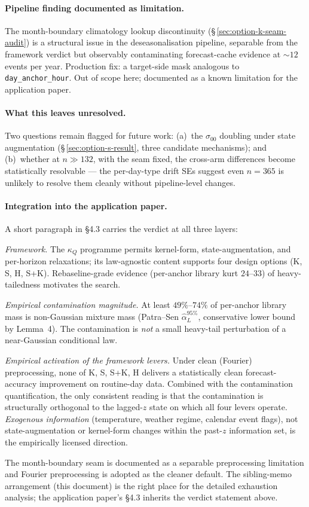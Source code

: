 \documentclass[11pt]{article}
\begin{document}
\paragraph{Pipeline finding documented as limitation.} The
month-boundary climatology lookup discontinuity
(\S\,\ref{sec:option-k-seam-audit}) is a structural issue in the
deseasonalisation pipeline, separable from the framework verdict
but observably contaminating forecast-cache evidence at
\(\sim 12\) events per year. Production fix: a target-side mask
analogous to \texttt{day\_anchor\_hour}. Out of scope here;
documented as a known limitation for the application paper.

\paragraph{What this leaves unresolved.} Two questions remain
flagged for future work: (a)~the \(\sigma_{00}\) doubling under
state augmentation
(\S\,\ref{sec:option-s-result}, three candidate mechanisms); and
(b)~whether at \(n \gg 132\), with the seam fixed, the cross-arm
differences become statistically resolvable --- the per-day-type
drift SEs suggest even \(n = 365\) is unlikely to resolve them
cleanly without pipeline-level changes.

\paragraph{Integration into the application paper.} A short paragraph
in \S4.3 carries the verdict at all three layers:

\emph{Framework.} The \(\kappa_Q\) programme permits kernel-form,
state-augmentation, and per-horizon relaxations; its law-agnostic
content supports four design options
(\textsf{K}, \textsf{S}, \textsf{H}, \textsf{S+K}). Rebaseline-grade
evidence (per-anchor library kurt \(24\)--\(33\)) of heavy-tailedness
motivates the search.

\emph{Empirical contamination magnitude.} At least \(49\%\)--\(74\%\)
of per-anchor library mass is non-Gaussian mixture mass (Patra--Sen
\(\hat\alpha_L^{95\%}\), conservative lower bound by Lemma~4). The
contamination is \emph{not} a small heavy-tail perturbation of a
near-Gaussian conditional law.

\emph{Empirical activation of the framework levers.} Under clean
(Fourier) preprocessing, none of \textsf{K}, \textsf{S},
\textsf{S+K}, \textsf{H} delivers a statistically clean
forecast-accuracy improvement on routine-day data. Combined with the
contamination quantification, the only consistent reading is that
the contamination is structurally orthogonal to the lagged-\(z\)
state on which all four levers operate. \emph{Exogenous information}
(temperature, weather regime, calendar event flags), not
state-augmentation or kernel-form changes within the past-\(z\)
information set, is the empirically licensed direction.

The month-boundary seam is documented as a separable preprocessing
limitation and Fourier preprocessing is adopted as the cleaner
default. The sibling-memo arrangement (this document) is the right
place for the detailed exhaustion analysis; the application paper's
\S4.3 inherits the verdict statement above.
\end{document}
